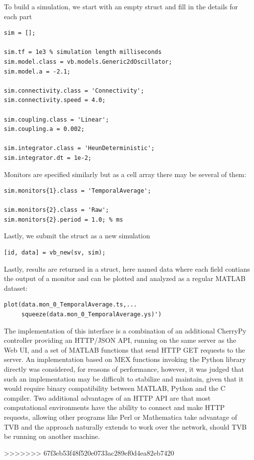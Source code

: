 To build a simulation, we start with an empty struct
and fill in the details for each part

\begin{lstlisting}
sim = [];

sim.tf = 1e3 % simulation length milliseconds
sim.model.class = vb.models.Generic2dOscillator;
sim.model.a = -2.1;

sim.connectivity.class = 'Connectivity';
sim.connectivity.speed = 4.0;

sim.coupling.class = 'Linear';
sim.coupling.a = 0.002;

sim.integrator.class = 'HeunDeterministic';
sim.integrator.dt = 1e-2;
\end{lstlisting}

Monitors are specified similarly but as a cell array there may be
several of them:

\begin{lstlisting}
sim.monitors{1}.class = 'TemporalAverage';

sim.monitors{2}.class = 'Raw';
sim.monitors{2}.period = 1.0; % ms
\end{lstlisting}


Lastly, we submit the struct as a new simulation

\begin{lstlisting}
[id, data] = vb_new(sv, sim);
\end{lstlisting}

\noindent Lastly, results are returned in a struct, here named data
where each field contians the output of a monitor and can be plotted
and analyzed as a regular MATLAB dataset:

\begin{lstlisting}
plot(data.mon_0_TemporalAverage.ts,...
     squeeze(data.mon_0_TemporalAverage.ys)')
\end{lstlisting}

The implementation of this interface is a combination of an additional
CherryPy controller providing an HTTP/JSON API, running on the same 
server as the Web UI, and a set of MATLAB functions that send HTTP 
GET requests to the server. An implementation based on MEX functions 
invoking the Python library directly was considered, for reasons of 
performance, however, it was judged that such an implementation may be
difficult to stabilize and maintain, given that it would require binary
compatibility between MATLAB, Python and the C compiler. Two additional 
advantages of an HTTP API are that most computational environments have
the ability to connect and make HTTP requests, allowing other programs 
like Perl or Mathematica take advantage of TVB and the approach naturally
extends to work over the network, should TVB be running on another machine.



>>>>>>> 67f3eb53f48f520e0733ac289ef0d4ea82eb7420
